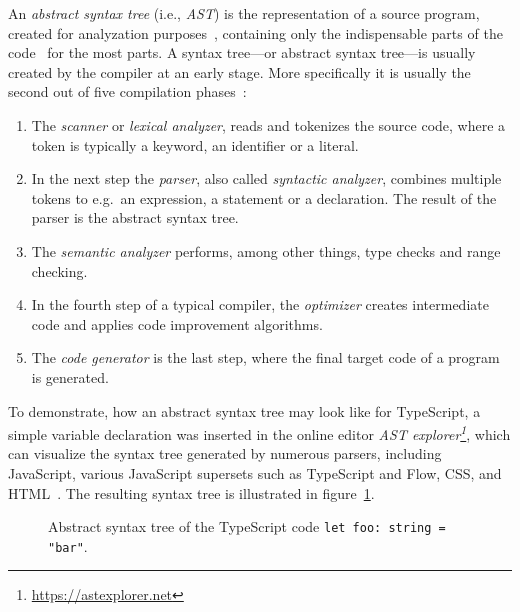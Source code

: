 An \emph{abstract syntax tree} (i.e., \emph{AST}) is the representation of a source program, created for analyzation purposes~\cite[p.~19]{CompilersAndInterpreters:Kenneth:2004}, containing only the indispensable parts of the code~\cite[p.~12]{FormaleSprachenAbstrakteAutomatenUndCompiler:Wagenknecht:2014} for the most parts. A syntax tree---or abstract syntax tree---is usually created by the compiler at an early stage. More specifically it is usually the second out of five compilation phases~\cite[pp.~2--3]{CompilersAndInterpreters:Kenneth:2004}: 
\begin{enumerate}
  \item The \emph{scanner} or \emph{lexical analyzer}, reads and tokenizes the source code, where a token is typically a keyword, an identifier or a literal.
  \item In the next step the \emph{parser}, also called \emph{syntactic analyzer}, combines multiple tokens to e.g.\ an expression, a statement or a declaration. The result of the parser is the abstract syntax tree.
  \item The \emph{semantic analyzer} performs, among other things, type checks and range checking.
  \item In the fourth step of a typical compiler, the \emph{optimizer} creates intermediate code and applies code improvement algorithms.
  \item The \emph{code generator} is the last step, where the final target code of a program is generated.
\end{enumerate}
To demonstrate, how an abstract syntax tree may look like for TypeScript, a simple variable declaration was inserted in the online editor \emph{AST explorer\footnote{\url{https://astexplorer.net}}}, which can visualize the syntax tree generated by numerous parsers, including JavaScript, various JavaScript supersets such as TypeScript and Flow, CSS, and HTML~\cite{ASTExplorer}. The resulting syntax tree is illustrated in figure~\ref{fig:ast}.

\begin{figure}
\centering

\caption{Abstract syntax tree of the TypeScript code \texttt{let foo: string = "bar"}.}
\label{fig:ast}
\end{figure}



